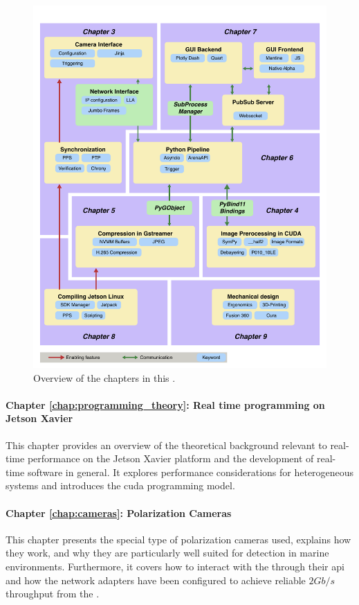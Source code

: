 \begin{figure}[H]
    \includegraphics[width=\textwidth]{chapters/10_intro/chapter_overview.pdf}
    \caption{Overview of the chapters in this \master.}
    \label{fig:overview}
\end{figure}


\paragraph{Chapter \ref{chap:programming_theory}: Real time programming on Jetson Xavier}
This chapter provides an overview of the theoretical background relevant to real-time performance on the Jetson Xavier platform and the development of real-time software in general.
It explores performance considerations for heterogeneous systems and introduces the \gls{cuda} programming model.

\paragraph{Chapter \ref{chap:cameras}: Polarization Cameras}
This chapter presents the special type of polarization cameras used, explains how they work, and why they are particularly well suited for detection in marine environments.
Furthermore, it covers how to interact with the \cams through their \gls{api} and how the network adapters have been configured to achieve reliable $2Gb/s$ throughput from the \cams.

